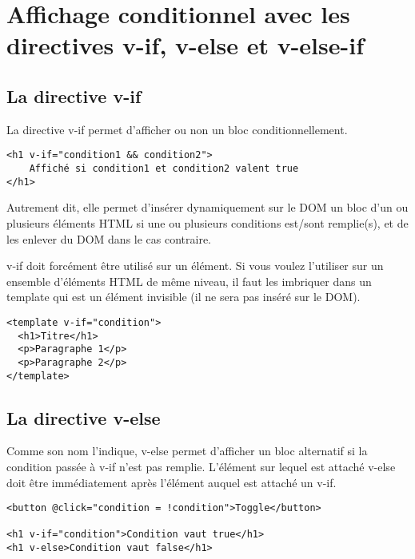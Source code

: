 \section{Affichage conditionnel avec les directives v-if, v-else et v-else-if}
\subsection{La directive {\color{monOrange}v-if}}
La directive {\color{monOrange}v-if} permet d'afficher ou non un bloc conditionnellement.
\begin{verbatim}
<h1 v-if="condition1 && condition2">
	Affiché si condition1 et condition2 valent true
</h1>
\end{verbatim}
Autrement dit, elle permet d'insérer dynamiquement sur le DOM un bloc d'un ou plusieurs éléments HTML si une ou plusieurs conditions est/sont remplie(s), et de les enlever du DOM dans le cas contraire.

{\color{monOrange}v-if} doit forcément être utilisé sur un élément. Si vous voulez l'utiliser sur un ensemble d'éléments HTML de même niveau, il faut les imbriquer dans un template qui est un élément invisible (il ne sera pas inséré sur le DOM).
\begin{verbatim}
<template v-if="condition">
  <h1>Titre</h1>
  <p>Paragraphe 1</p>
  <p>Paragraphe 2</p>
</template>
\end{verbatim}

\subsection{La directive {\color{monOrange}v-else}}
Comme son nom l'indique, {\color{monOrange}v-else} permet d'afficher un bloc alternatif si la condition passée à {\color{monOrange}v-if} n'est pas remplie. L'élément sur lequel est attaché {\color{monOrange}v-else} doit être immédiatement après l'élément auquel est attaché un {\color{monOrange}v-if}.
\begin{verbatim}
<button @click="condition = !condition">Toggle</button>

<h1 v-if="condition">Condition vaut true</h1>
<h1 v-else>Condition vaut false</h1>
\end{verbatim}

